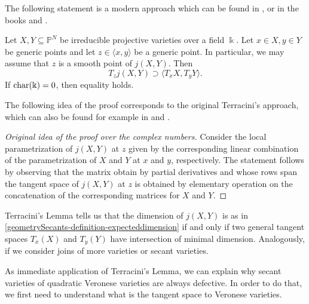 The following statement is a modern approach which can be found in \cite{FR81}, \cite{Adl87} or in the books \cite[Theorem 1.10]{Zak93} and \cite[Theorem 1.4.1]{Rus16}.

\begin{lemma}
\label{geometrySecants-lemma-terracini}
    Let $X, Y \subseteq \mathbb{P}^N$ be irreducible projective varieties over a field $\Bbbk$. Let $x \in X, y \in Y$ be generic points and let $z \in \langle x,y \rangle$ be a generic point. In particular, we may assume that $z$ is a smooth point of $j(X,Y)$. Then
    \[
        T_{z} j(X,Y) \supset \langle T_x X , T_y Y\rangle.
    \]
    If ${\rm char}(\Bbbk) = 0$, then equality holds. 
\end{lemma}
The following idea of the proof corresponds to the original Terracini's approach, which can also be found for example in \cite{BO08} and \cite{BCCGO18}. 
\begin{proof}[Original idea of the proof over the complex numbers]
    Consider the local parametrization of $j(X,Y)$ at $z$ given by the corresponding linear combination of the parametrization of $X$ and $Y$ at $x$ and $y$, respectively. The statement follows by observing that the matrix obtain by partial derivatives and whose rows span the tangent space of $j(X,Y)$ at $z$ is obtained by elementary operation on the concatenation of the corresponding matrices for $X$ and $Y$. 
\end{proof}

\begin{remark}
    Terracini's Lemma tells us that the dimension of $j(X,Y)$ is as in \ref{geometrySecants-definition-expecteddimension} if and only if two general tangent spaces $T_x(X)$ and $T_y(Y)$ have intersection of minimal dimension. Analogously, if we consider joins of more varieties or secant varieties. 
\end{remark}

As immediate application of Terracini's Lemma, we can explain why secant varieties of quadratic Veronese varieties are always defective. In order to do that, we first need to understand what is the tangent space to Veronese varieties. 

